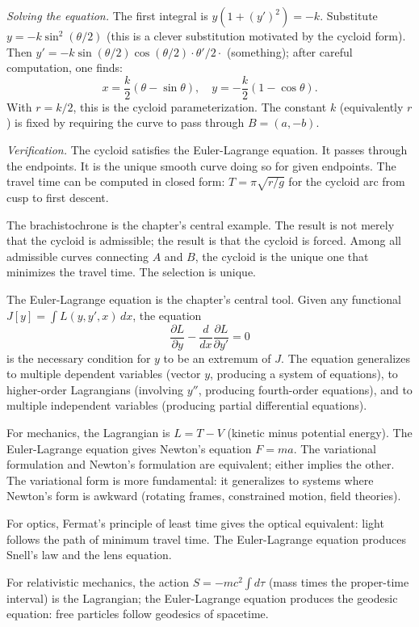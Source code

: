 \emph{Solving the equation.} The first integral is $y(1 + (y')^2) =
-k$. Substitute $y = -k \sin^2(\theta/2)$ (this is a clever
substitution motivated by the cycloid form). Then $y' = -k
\sin(\theta/2)\cos(\theta/2) \cdot \theta'/2 \cdot$ (something);
after careful computation, one finds:
\[
x = \frac{k}{2}(\theta - \sin\theta), \quad y = -\frac{k}{2}(1 -
\cos\theta).
\]
With $r = k/2$, this is the cycloid parameterization. The constant
$k$ (equivalently $r$) is fixed by requiring the curve to pass
through $B = (a, -b)$.

\emph{Verification.} The cycloid satisfies the Euler-Lagrange
equation. It passes through the endpoints. It is the unique smooth
curve doing so for given endpoints. The travel time can be computed
in closed form: $T = \pi \sqrt{r/g}$ for the cycloid arc from cusp
to first descent.

The brachistochrone is the chapter's central example. The result is
not merely that the cycloid is admissible; the result is that the
cycloid is forced. Among all admissible curves connecting $A$ and
$B$, the cycloid is the unique one that minimizes the travel time.
The selection is unique.

The Euler-Lagrange equation is the chapter's central tool. Given any
functional $J[y] = \int L(y, y', x) \, dx$, the equation
\[
\frac{\partial L}{\partial y} - \frac{d}{dx}\frac{\partial L}{\partial
y'} = 0
\]
is the necessary condition for $y$ to be an extremum of $J$. The
equation generalizes to multiple dependent variables (vector $y$,
producing a system of equations), to higher-order Lagrangians
(involving $y''$, producing fourth-order equations), and to multiple
independent variables (producing partial differential equations).

For mechanics, the Lagrangian is $L = T - V$ (kinetic minus potential
energy). The Euler-Lagrange equation gives Newton's equation $F =
ma$. The variational formulation and Newton's formulation are
equivalent; either implies the other. The variational form is more
fundamental: it generalizes to systems where Newton's form is
awkward (rotating frames, constrained motion, field theories).

For optics, Fermat's principle of least time gives the optical
equivalent: light follows the path of minimum travel time. The
Euler-Lagrange equation produces Snell's law and the lens equation.

For relativistic mechanics, the action $S = -mc^2 \int d\tau$ (mass
times the proper-time interval) is the Lagrangian; the
Euler-Lagrange equation produces the geodesic equation: free
particles follow geodesics of spacetime.


